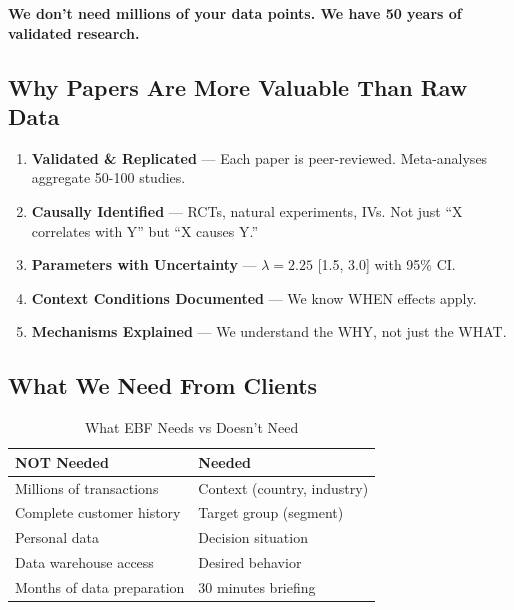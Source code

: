 \begin{tcolorbox}[colback=yellow!5!white, colframe=yellow!75!black,
    title=The Core Insight]
\textbf{We don't need millions of your data points. We have 50 years of validated research.}
\end{tcolorbox}

\subsection{Why Papers Are More Valuable Than Raw Data}

\begin{enumerate}
\item \textbf{Validated \& Replicated} --- Each paper is peer-reviewed.
      Meta-analyses aggregate 50-100 studies.
\item \textbf{Causally Identified} --- RCTs, natural experiments, IVs.
      Not just ``X correlates with Y'' but ``X causes Y.''
\item \textbf{Parameters with Uncertainty} --- $\lambda = 2.25$ [1.5, 3.0] with 95\% CI.
\item \textbf{Context Conditions Documented} --- We know WHEN effects apply.
\item \textbf{Mechanisms Explained} --- We understand the WHY, not just the WHAT.
\end{enumerate}

\subsection{What We Need From Clients}

\begin{table}[htbp]
\centering
\caption{What EBF Needs vs Doesn't Need}
\label{tab:data-needs}
\renewcommand{\arraystretch}{1.3}
\begin{tabular}{@{}ll@{}}
\toprule
\textbf{NOT Needed} & \textbf{Needed} \\
\midrule
Millions of transactions & Context (country, industry) \\
Complete customer history & Target group (segment) \\
Personal data & Decision situation \\
Data warehouse access & Desired behavior \\
Months of data preparation & 30 minutes briefing \\
\bottomrule
\end{tabular}
\end{table}

